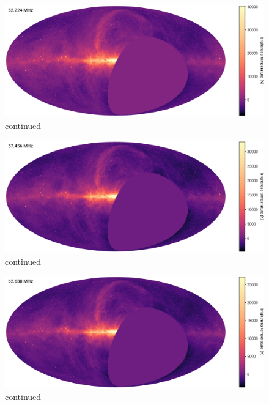 \begin{bibunit}
\addtocounter{figure}{-1}
\begin{figure}
    \centering
    \includegraphics[width=\textwidth]{figures/chapter3/spw10}
    \caption{
        continued
    }
    \label{fig:channel-maps}
\end{figure}

\addtocounter{figure}{-1}
\begin{figure}
    \centering
    \includegraphics[width=\textwidth]{figures/chapter3/spw12}
    \caption{
        continued
    }
    \label{fig:channel-maps}
\end{figure}

\addtocounter{figure}{-1}
\begin{figure}
    \centering
    \includegraphics[width=\textwidth]{figures/chapter3/spw14}
    \caption{
        continued
    }
    \label{fig:channel-maps}
\end{figure}


\end{bibunit}

